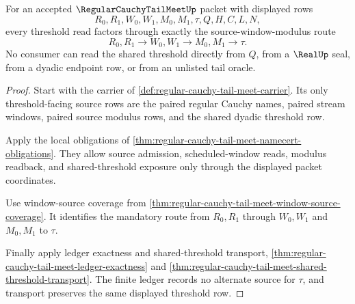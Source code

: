 \begin{theorem}
\label{thm:regular-cauchy-tail-meet-source-modulus-exhaustion}
For an accepted $\RegularCauchyTailMeetUp$ packet with displayed rows
$$
R_0,R_1,W_0,W_1,M_0,M_1,\tau,Q,H,C,L,N,
$$
every threshold read factors through exactly the source-window-modulus route
$$
R_0,R_1 \longrightarrow W_0,W_1 \longrightarrow M_0,M_1 \longrightarrow \tau.
$$
No consumer can read the shared threshold directly from $Q$, from a $\RealUp$ seal, from a dyadic endpoint row, or from an unlisted tail oracle.
\end{theorem}
\begin{proof}
Start with the carrier of \autoref{def:regular-cauchy-tail-meet-carrier}. Its only threshold-facing source rows are the paired regular Cauchy names, paired stream windows, paired source modulus rows, and the shared dyadic threshold row.

Apply the local obligations of \autoref{thm:regular-cauchy-tail-meet-namecert-obligations}. They allow source admission, scheduled-window reads, modulus readback, and shared-threshold exposure only through the displayed packet coordinates.

Use window-source coverage from \autoref{thm:regular-cauchy-tail-meet-window-source-coverage}. It identifies the mandatory route from $R_0,R_1$ through $W_0,W_1$ and $M_0,M_1$ to $\tau$.

Finally apply ledger exactness and shared-threshold transport, \autoref{thm:regular-cauchy-tail-meet-ledger-exactness} and \autoref{thm:regular-cauchy-tail-meet-shared-threshold-transport}. The finite ledger records no alternate source for $\tau$, and transport preserves the same displayed threshold row.
\end{proof}

